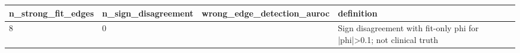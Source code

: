 \begin{tabular}{llll}
\hline
n\_strong\_fit\_edges & n\_sign\_disagreement & wrong\_edge\_detection\_auroc & definition \\
\hline
8 & 0 &  & Sign disagreement with fit-only phi for |phi|>0.1; not clinical truth \\
\hline
\end{tabular}
